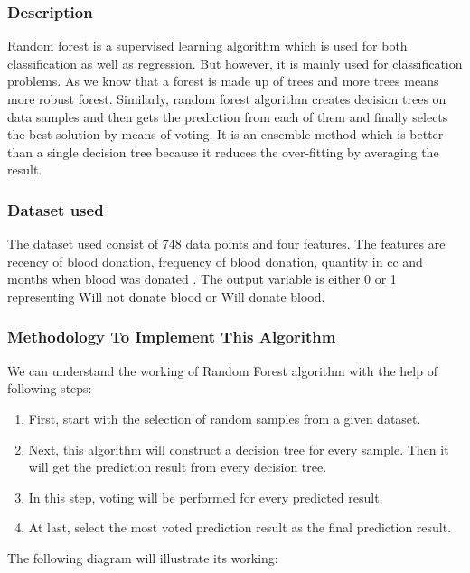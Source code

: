 \documentclass[12pt,a4paper]{article}
\begin{document}
\subsubsection{Description}

\quad \quad Random forest is a supervised learning algorithm which is used for both classification as well as regression. But however, it is mainly used for classification problems. As we know that a forest is made up of trees and more trees means more robust forest. Similarly, random forest algorithm creates decision trees on data samples and then gets the prediction from each of them and finally selects the best solution by means of voting. It is an ensemble method which is better than a single decision tree because it reduces the over-fitting by averaging the result.



\subsubsection{Dataset used}

\quad \quad The dataset used consist of 748 data points and four features. The features are recency of blood donation, frequency of blood donation, quantity in cc and months when blood was donated . The output variable is either 0 or 1 representing Will not donate blood or Will donate blood.

\subsubsection{Methodology To Implement This Algorithm}

\quad \quad We can understand the working of Random Forest algorithm with the help of following steps: 

\begin{enumerate}
    \item First, start with the selection of random samples from a given dataset.
    \item Next, this algorithm will construct a decision tree for every sample. Then it will get the prediction result from every decision tree.
    \item In this step, voting will be performed for every predicted result.
    \item At last, select the most voted prediction result as the final prediction result. 
\end{enumerate}

\quad The following diagram will illustrate its working:
\end{document}
